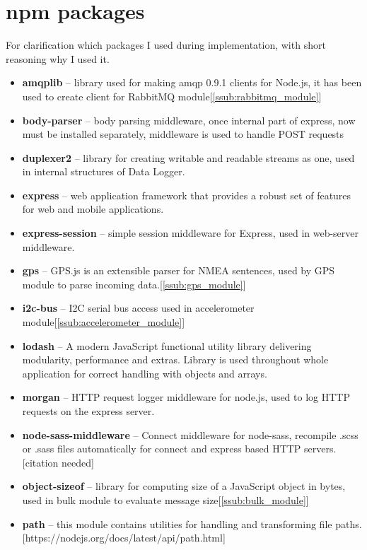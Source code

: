 \chapter{npm packages} %
\label{sec:npm_packages}
For clarification which packages I used during implementation, with short reasoning why I used it.
\begin{itemize}
	\item \textbf{amqplib} -- library used for making amqp 0.9.1 clients for Node.js, it has been used to create client for RabbitMQ module[\ref{ssub:rabbitmq_module}]
   	\item \textbf{body-parser} -- body parsing middleware, once internal part of express, now must be installed separately, middleware is used to handle POST requests
    \item \textbf{duplexer2} -- library for creating writable and readable streams as one, used in internal structures of Data Logger.
    \item \textbf{express} -- web application framework that provides a robust set of features for web and mobile applications.
	\item \textbf{express-session} -- simple session middleware for Express, used in web-server middleware.
	\item \textbf{gps} -- GPS.js is an extensible parser for NMEA sentences, used by GPS module to parse incoming data.[\ref{ssub:gps_module}]
    \item \textbf{i2c-bus} -- I2C serial bus access used in accelerometer module[\ref{ssub:accelerometer_module}]
    \item \textbf{lodash} -- A modern JavaScript functional utility library delivering modularity, performance and extras. Library is used throughout whole application for correct handling with objects and arrays.
    \item \textbf{morgan} -- HTTP request logger middleware for node.js, used to log HTTP requests on the express server.
    \item \textbf{node-sass-middleware} -- Connect middleware for node-sass, recompile .scss or .sass files automatically for connect and express based HTTP servers.[citation needed]
    \item \textbf{object-sizeof} -- library for computing size of a JavaScript object in bytes, used in bulk module to evaluate message size[\ref{ssub:bulk_module}]
    \item \textbf{path} -- this module contains utilities for handling and transforming file paths.[https://nodejs.org/docs/latest/api/path.html]

\end{itemize}
